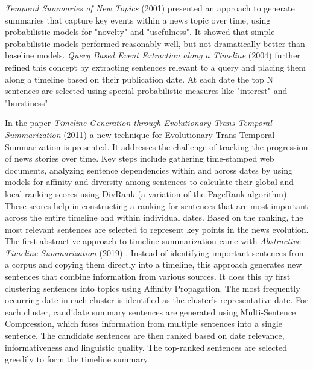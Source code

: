 \documentclass[a4paper,10pt]{report} %
\begin{document}
\textit{Temporal Summaries of New Topics} (2001) \cite{AllanTemporalSummaries} presented an approach to generate summaries that capture key events within a news topic over time, using probabilistic models for "novelty" and "usefulness". It showed that simple probabilistic models performed reasonably well, but not dramatically better than baseline models. \textit{Query Based Event Extraction along a Timeline} (2004) \cite{ChieuQueryBasedEvent} further refined this concept by extracting sentences relevant to a query and placing them along a timeline based on their publication date. At each date the top N sentences are selected using special probabilistic measures like "interest" and "burstiness".

In the paper \textit{Timeline Generation through Evolutionary Trans-Temporal Summarization} (2011) \cite{YanTimelineGeneration} a new technique for Evolutionary Trans-Temporal Summarization is presented. It addresses the challenge of tracking the progression of news stories over time. Key steps include gathering time-stamped web documents, analyzing sentence dependencies within and across dates by using models for affinity and diversity among sentences to calculate their global and local ranking scores using DivRank (a variation of the PageRank algorithm). These scores help in constructing a ranking for sentences that are most important across the entire timeline and within individual dates. Based on the ranking, the most relevant sentences are selected to represent key points in the news evolution. \\

The first abstractive approach to timeline summarization came with \textit{Abstractive Timeline Summarization} (2019) \cite{SteenAbstractiveTimeline}. Instead of identifying important sentences from a corpus and copying them directly into a timeline, this approach generates new sentences that combine information from various sources. It does this by first clustering sentences into topics using Affinity Propagation. The most frequently occurring date in each cluster is identified as the cluster's representative date. For each cluster, candidate summary sentences are generated using Multi-Sentence Compression, which fuses information from multiple sentences into a single sentence. The candidate sentences are then ranked based on date relevance, informativeness and linguistic quality. The top-ranked sentences are selected greedily to form the timeline summary. \\
\end{document}
